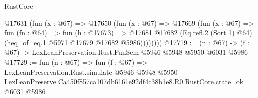 \begin{lexlean}{RustCore}
\begin{coremodule}
          @17631
            (fun (x : @67) =>
            @17650
              (fun (x : @67) =>
              @17669
                (fun (x : @67) =>
                fun (fn : @64) =>
                fun (h : @17673) =>
                @17681
                  @17682
                  (Eq.refl.{2} (Sort 1) @64)
                  (heq_of_eq.{1} @5971 @17679 @17682 @5986))))))))
@17719 := (n : @67) -> (f : @67) -> LexLeanPreservation.Rust.FunSem @5946 @5948 @5950 @6031 @5986
@17729 := fun (n : @67) =>
  fun (f : @67) =>
  LexLeanPreservation.Rust.simulate
    @5946
    @5948
    @5950
    LexLeanPreserve.Ca450f857ca107db6161e92df4c38b1e8.R0.RustCore.crate_ok
    @6031
    @5986
\end{coremodule}
\end{lexlean}
